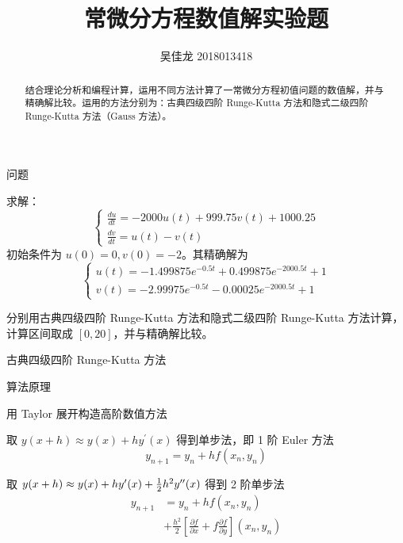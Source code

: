 \documentclass[a4paper]{article}
\providecommand{\keywords}[1]{\textbf{\textit{关键词}} #1}
\begin{document}
 
\title{常微分方程数值解实验题}
\author{吴佳龙 2018013418}
\date{}
\maketitle

\begin{abstract}
	结合理论分析和编程计算，运用不同方法计算了一常微分方程初值问题的数值解，并与精确解比较。运用的方法分别为：古典四级四阶 Runge-Kutta 方法和隐式二级四阶 Runge-Kutta 方法（Gauss 方法）。
\end{abstract}


\begin{multicols}{2}

\begin{section}{问题}

	求解：$$\left\{\begin{array}{l}{\frac{d u}{d t}=-2000 u(t)+999.75 v(t)+1000.25} \\ {\frac{d v}{d t}=u(t)-v(t)}\end{array}\right.$$ 初始条件为 $u(0)=0, v(0)=-2$。其精确解为 $$\left\{\begin{array}{l}{u(t)=-1.499875 e^{-0.5 t}+0.499875 e^{-2000.5 t}+1} \\ {v(t)=-2.99975 e^{-0.5 t}-0.00025 e^{-2000.5 t}+1}\end{array}\right.$$
	
	分别用古典四级四阶 Runge-Kutta 方法和隐式二级四阶 Runge-Kutta 方法计算，计算区间取成 $[0,20]$，并与精确解比较。

\end{section}

\begin{section}{古典四级四阶 Runge-Kutta 方法}
	
	\begin{subsection}{算法原理}
	
		\begin{subsubsection}{用 Taylor 展开构造高阶数值方法}
			
			取 $y(x+h) \approx y(x)+hy^\prime(x)$ 得到单步法，即 1 阶 Euler 方法 $$y_{n+1} = y_{n}+hf(x_n,y_n)$$
			
			取 $y(x+h) \approx y(x)+hy^\prime(x) + {1\over 2}h^2y^{\prime\prime}(x)$ 得到 2 阶单步法 \begin{align}
				\nonumber
				y_{n+1}&=y_{n}+h f\left(x_{n}, y_{n}\right)\\  &+\frac{h^{2}}{2}\left[\frac{\partial f}{\partial x}+f \frac{\partial f}{\partial y}\right]\left(x_{n}, y_{n}\right)
				\label{taylor}
				\end{align}
			

\end{subsubsection}
\end{subsection}
\end{section}
\end{multicols}
\end{document}
